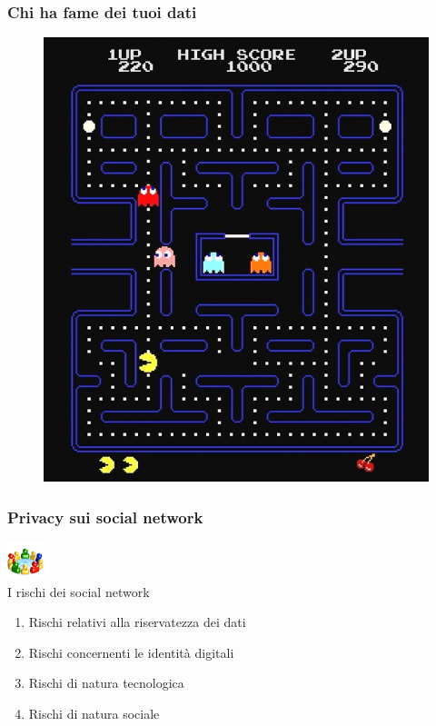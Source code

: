 \documentclass[xcolor=svgnames,handout]{beamer}
\begin{document}
\begin{frame}
	\frametitle{Chi ha fame dei tuoi dati}

	\begin{figure}[+ht]
			\begin{center}
					\includegraphics{img/pacman.jpg}
			\end{center}
	\end{figure}
\end{frame}

\begin{frame}
	\frametitle{Privacy sui social network}

	\begin{block}{\includegraphics[width=40px]{img/social.png} \\ I rischi dei social network}
			\begin{enumerate}
						\pause
					\item Rischi relativi alla riservatezza dei dati
						\pause
					\item Rischi concernenti le identità digitali
						\pause
					\item Rischi di natura tecnologica
						\pause
					\item Rischi di natura sociale
			\end{enumerate}
	\end{block}
\end{frame}
\end{document}

